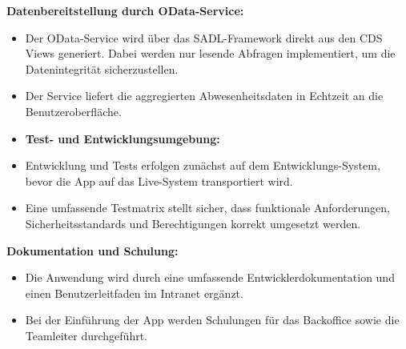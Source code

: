 \textbf{Datenbereitstellung durch OData-Service:}
\begin{itemize}
    \item Der OData-Service wird über das SADL-Framework direkt aus den CDS Views generiert. Dabei werden nur lesende Abfragen implementiert, um die Datenintegrität sicherzustellen.
    \item Der Service liefert die aggregierten Abwesenheitsdaten in Echtzeit an die Benutzeroberfläche.
\end{itemize}
\begin{itemize}
    \item \textbf{Test- und Entwicklungsumgebung:}
    \item Entwicklung und Tests erfolgen zunächst auf dem Entwicklungs-System, bevor die App auf das Live-System transportiert wird.
    \item Eine umfassende Testmatrix stellt sicher, dass funktionale Anforderungen, Sicherheitsstandards und Berechtigungen korrekt umgesetzt werden.
\end{itemize}
\textbf{Dokumentation und Schulung:}
\begin{itemize}
    \item Die Anwendung wird durch eine umfassende Entwicklerdokumentation und einen Benutzerleitfaden im Intranet ergänzt.
    \item Bei der Einführung der App werden Schulungen für das Backoffice sowie die Teamleiter durchgeführt.
\end{itemize}